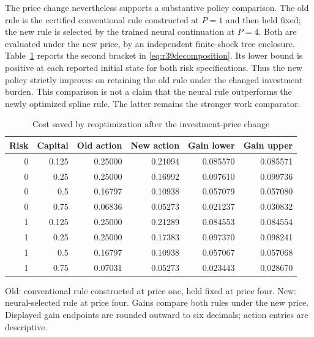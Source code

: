 \documentclass[ecta,nameyear,draft]{econsocart}
\theoremstyle{definition}
\theoremstyle{remark}
\begin{document}
The price change nevertheless supports a substantive policy comparison.
The old rule is the certified conventional rule constructed at $P=1$ and then
held fixed; the new rule is selected by the trained neural continuation at
$P=4$. Both are evaluated under the new price, by an independent finite-shock
tree enclosure. Table~\ref{tab:r39economic} reports the second bracket in
\eqref{eq:r39decomposition}. Its lower bound is positive at each reported
initial state for both risk specifications. Thus the new policy strictly
improves on retaining the old rule under the changed investment burden.
This comparison is not a claim that the neural rule outperforms the newly
optimized spline rule. The latter remains the stronger work comparator.


\begin{table}[htbp]
\centering\small\setlength{\tabcolsep}{5pt}
\caption{Cost saved by reoptimization after the investment-price change}\label{tab:r39economic}
\begin{tabular}{rrrrrr}
\toprule
Risk & Capital & Old action & New action & Gain lower & Gain upper\\
\midrule
0 & 0.125 & 0.25000 & 0.21094 & 0.085570 & 0.085571\\
0 & 0.25 & 0.25000 & 0.16992 & 0.097610 & 0.099736\\
0 & 0.5 & 0.16797 & 0.10938 & 0.057079 & 0.057080\\
0 & 0.75 & 0.06836 & 0.05273 & 0.021237 & 0.030832\\
1 & 0.125 & 0.25000 & 0.21289 & 0.084553 & 0.084554\\
1 & 0.25 & 0.25000 & 0.17383 & 0.097370 & 0.098241\\
1 & 0.5 & 0.16797 & 0.10938 & 0.057067 & 0.057068\\
1 & 0.75 & 0.07031 & 0.05273 & 0.023443 & 0.028670\\
\bottomrule
\end{tabular}
\par\smallskip\begin{minipage}{.96\linewidth}\footnotesize Old: conventional rule constructed at price one, held fixed at price four. New: neural-selected rule at price four. Gains compare both rules under the new price. Displayed gain endpoints are rounded outward to six decimals; action entries are descriptive.\end{minipage}
\end{table}
\end{document}
